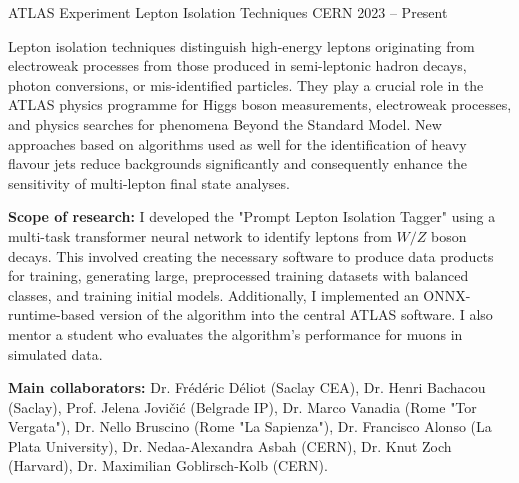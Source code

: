 \begin{cventries}
  \cventry
    {ATLAS Experiment} %
    {Lepton Isolation Techniques} %
    {CERN} %
    {2023 -- Present} %
  {
    \begin{cvitems} %
      \item {Lepton isolation techniques distinguish high-energy leptons originating from electroweak processes from those produced in semi-leptonic hadron decays, photon conversions, or mis-identified
      particles. They play a crucial role in the ATLAS physics programme for Higgs boson
      measurements, electroweak processes, and physics searches for phenomena Beyond the Standard Model. New approaches based on algorithms used as well for the identification of heavy flavour jets reduce backgrounds significantly and consequently enhance the sensitivity of multi-lepton final state analyses.}
      \item \textbf{Scope of research:} I developed the "Prompt Lepton Isolation Tagger" using a multi-task
      transformer neural network to identify leptons from \(W / Z\) boson decays. This involved
      creating the necessary software to produce data products for training, generating large,
      preprocessed training datasets with balanced classes, and training initial models. Additionally,
      I implemented an ONNX-runtime-based version of the algorithm into the central ATLAS
      software. I also mentor a student who evaluates the algorithm's performance for muons in
      simulated data.
      \item \textbf{Main collaborators:} Dr. Frédéric Déliot (Saclay CEA), Dr. Henri Bachacou (Saclay), Prof. Jelena Jovičić (Belgrade IP), Dr. Marco Vanadia (Rome "Tor Vergata"), Dr. Nello Bruscino
      (Rome "La Sapienza"), Dr. Francisco Alonso (La Plata University), Dr. Nedaa-Alexandra
      Asbah (CERN), Dr. Knut Zoch (Harvard), Dr. Maximilian Goblirsch-Kolb (CERN).
    \end{cvitems}
  }


\end{cventries}
